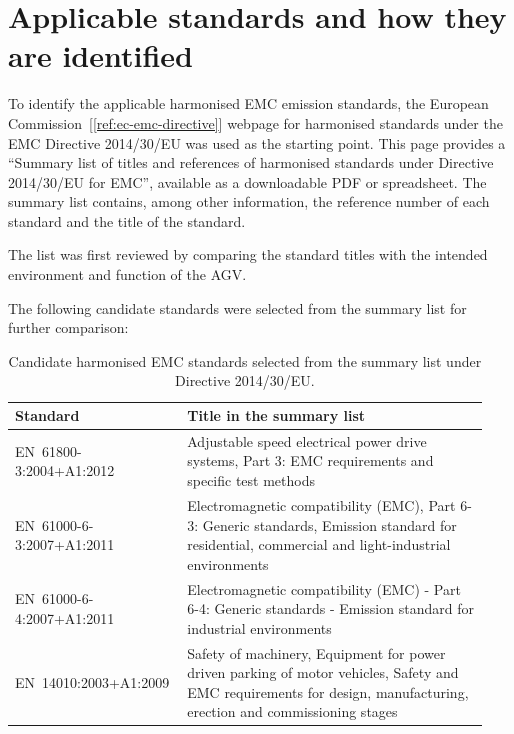 \section{Applicable standards and how they are identified}
To identify the applicable harmonised EMC emission standards, the European Commission~[\ref{ref:ec-emc-directive}]
webpage for harmonised standards under the EMC Directive 2014/30/EU was used as the
starting point. This page provides a ``Summary list of titles and references of harmonised
standards under Directive 2014/30/EU for EMC'', available as a downloadable PDF or
spreadsheet. The summary list contains, among other information, the reference number of
each standard and the title of the standard.

The list was first reviewed by comparing the standard titles with the intended environment
and function of the AGV.

The following candidate standards were selected from the summary list for further
comparison:

\begin{table}[H]
\centering
\caption{Candidate harmonised EMC standards selected from the summary list under Directive 2014/30/EU.}
\small
\setlength{\tabcolsep}{4pt}
\begin{tabular}{@{}p{0.32\linewidth}p{0.62\linewidth}@{}}
\hline
{\raggedright\textbf{Standard}\par} & {\raggedright\textbf{Title in the summary list}\par} \\
\hline
{\raggedright EN~61800-3:2004+A1:2012\par} &
{\raggedright Adjustable speed electrical power drive systems, Part 3: EMC requirements and specific test methods\par} \\

{\raggedright EN~61000-6-3:2007+A1:2011\par} &
{\raggedright Electromagnetic compatibility (EMC), Part 6-3: Generic standards, Emission standard for residential, commercial and light-industrial environments\par} \\

{\raggedright EN~61000-6-4:2007+A1:2011\par} &
{\raggedright Electromagnetic compatibility (EMC) - Part 6-4: Generic standards - Emission standard for industrial environments\par} \\

{\raggedright EN~14010:2003+A1:2009\par} &
{\raggedright Safety of machinery, Equipment for power driven parking of motor vehicles, Safety and EMC requirements for design, manufacturing, erection and commissioning stages\par} \\
\hline
\end{tabular}
\end{table}

